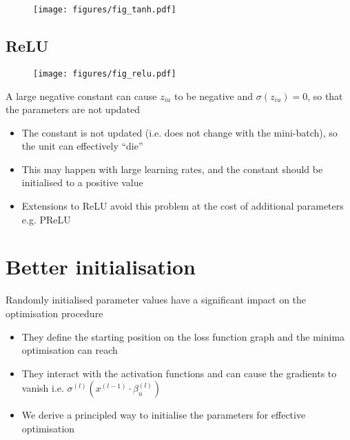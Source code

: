 \documentclass[c]{beamer}
\begin{document}
\begin{frame}{\secsubname}
	\begin{figure}
		\texttt{[image: figures/fig\_tanh.pdf]}
	\end{figure}
\end{frame}

\subsection{ReLU}

\begin{frame}{\secsubname}
	\begin{figure}
		\texttt{[image: figures/fig\_relu.pdf]}
	\end{figure}
\end{frame}

\begin{frame}{\secsubname}
	A large negative constant can cause $z_{iu}$ to be negative and $\sigma(z_{iu}) = 0$, so that the parameters are not updated
	\begin{itemize}
		\item The constant is not updated (i.e. does not change with the mini-batch), so the unit can effectively ``die'' 
		\item This may happen with large learning rates, and the constant should be initialised to a positive value
		\item Extensions to ReLU avoid this problem at the cost of additional parameters e.g. PReLU \parencite{He2015}
	\end{itemize}
\end{frame}

\section{Better initialisation}

\begin{frame}{\secname}
	Randomly initialised parameter values have a significant impact on the optimisation procedure
	\begin{itemize}
		\item They define the starting position on the loss function graph and the minima optimisation can reach
		\item They interact with the activation functions and can cause the gradients to vanish i.e. $\sigma^{(l)}(x^{(l-1)} \cdot \beta^{(l)}_u)$
		\item We derive a principled way to initialise the parameters for effective optimisation \parencite{Glorot2010}
	\end{itemize}
\end{frame}
\end{document}
